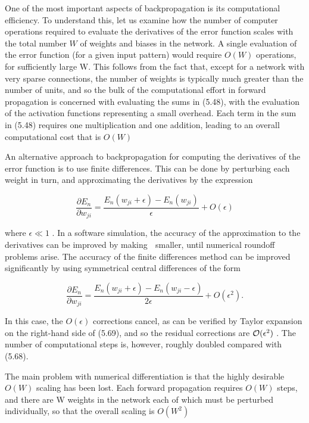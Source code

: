 \documentclass[
  10
]{article}
\begin{document}
One of the most important aspects of backpropagation is its
computational efficiency. To understand this, let us examine how the
number of computer operations required to evaluate the derivatives of
the error function scales with the total number \(W\) of weights and
biases in the network. A single evaluation of the error function (for a
given input pattern) would require \(O ( W )\) operations, for
sufficiently large W. This follows from the fact that, except for a
network with very sparse connections, the number of weights is typically
much greater than the number of units, and so the bulk of the
computational effort in forward propagation is concerned with evaluating
the sums in (5.48), with the evaluation of the activation functions
representing a small overhead. Each term in the sum in (5.48) requires
one multiplication and one addition, leading to an overall computational
cost that is \(O ( W )\)

An alternative approach to backpropagation for computing the derivatives
of the error function is to use finite differences. This can be done by
perturbing each weight in turn, and approximating the derivatives by the
expression

\[
\frac {\partial E _ {n}}{\partial w _ {j i}} = \frac {E _ {n} (w _ {j i} + \epsilon) - E _ {n} (w _ {j i})}{\epsilon} + O (\epsilon)\tag{5.68}
\]

where \(\epsilon \ll 1\) . In a software simulation, the accuracy of the
approximation to the derivatives can be improved by making  smaller,
until numerical roundoff problems arise. The accuracy of the finite
differences method can be improved significantly by using symmetrical
central differences of the form

\[
\frac {\partial E _ {n}}{\partial w _ {j i}} = \frac {E _ {n} (w _ {j i} + \epsilon) - E _ {n} (w _ {j i} - \epsilon)}{2 \epsilon} + O (\epsilon^ {2}).\tag{5.69}
\]

In this case, the \(O ( \epsilon )\) corrections cancel, as can be
verified by Taylor expansion on the right-hand side of (5.69), and so
the residual corrections are \({ \cal O } ( \epsilon ^ { 2 } )\) . The
number of computational steps is, however, roughly doubled compared with
(5.68).

The main problem with numerical differentiation is that the highly
desirable \(O ( W )\) scaling has been lost. Each forward propagation
requires \(O ( W )\) steps, and there are W weights in the network each
of which must be perturbed individually, so that the overall scaling is
\(O ( W ^ { 2 } )\)
\end{document}
